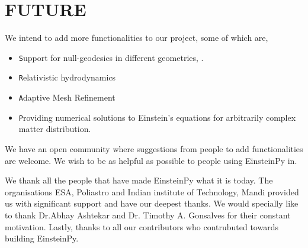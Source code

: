 \documentclass{aastex63}
\begin{document}
\section{FUTURE} \label{sec:FUTURE}
We intend to add more functionalities to our project, some of which are, 
\begin{itemize}
\item \texttt Support for null-geodesics in different geometries, . 
\item \texttt Relativistic hydrodynamics
\item \texttt Adaptive Mesh Refinement 
\item \texttt Providing numerical solutions to Einstein’s equations for arbitrarily complex matter distribution.
\end{itemize}

We have an open community where suggestions from people to add functionalities are welcome. We wish to be as helpful as possible to people using EinsteinPy in.



\acknowledgments

We thank all the people that have made EinsteinPy what it is today.  
The organisations ESA, Poliastro and Indian institute of Technology, Mandi provided us with significant support and have our deepest thanks.
We would specially like to thank Dr.Abhay Ashtekar and  Dr. Timothy A. Gonsalves for their constant motivation.
Lastly, thanks to all our contributors who contrubuted towards building EinsteinPy.

%



\end{document}
